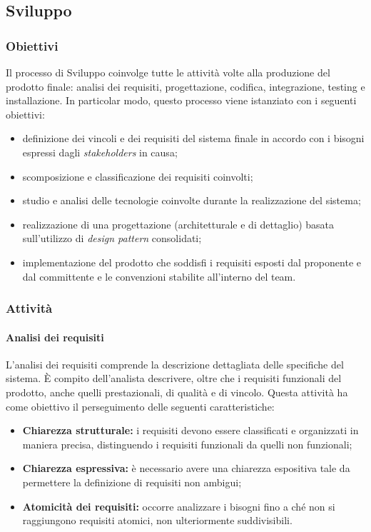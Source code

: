 \subsection{Sviluppo}
\subsubsection{Obiettivi}
Il processo di Sviluppo coinvolge tutte le attività volte alla produzione del prodotto finale: analisi dei requisiti,  progettazione, codifica, integrazione, testing e installazione. In particolar modo, questo processo viene istanziato con i seguenti obiettivi:
\begin{itemize}
	\item definizione dei vincoli e dei requisiti del sistema finale in accordo con i bisogni espressi dagli \textit{stakeholders\glo} in causa;
	\item scomposizione e classificazione dei requisiti coinvolti;
	\item studio e analisi delle tecnologie coinvolte durante la realizzazione del sistema;
	\item realizzazione di una progettazione (architetturale e di dettaglio) basata sull'utilizzo di \textit{design pattern\glo} consolidati;
	\item implementazione del prodotto che soddisfi i requisiti esposti dal proponente e dal committente e le convenzioni stabilite all'interno del team.
\end{itemize}
\subsubsection{Attività}
\paragraph{Analisi dei requisiti}
L'analisi dei requisiti comprende la descrizione dettagliata delle specifiche del sistema. È compito dell'analista descrivere, oltre che i requisiti funzionali del prodotto, anche quelli prestazionali, di qualità e di vincolo.
Questa attività ha come obiettivo il perseguimento delle seguenti caratteristiche:
\begin{itemize}
	\item \textbf{Chiarezza strutturale:} i requisiti devono essere classificati e organizzati in maniera precisa, distinguendo i requisiti funzionali da quelli non funzionali;
	\item \textbf{Chiarezza espressiva:} è necessario avere una chiarezza espositiva tale da permettere la definizione di requisiti non ambigui;
	\item \textbf{Atomicità dei requisiti:} occorre analizzare i bisogni fino a ché non si raggiungono requisiti atomici, non ulteriormente suddivisibili.
\end{itemize}

